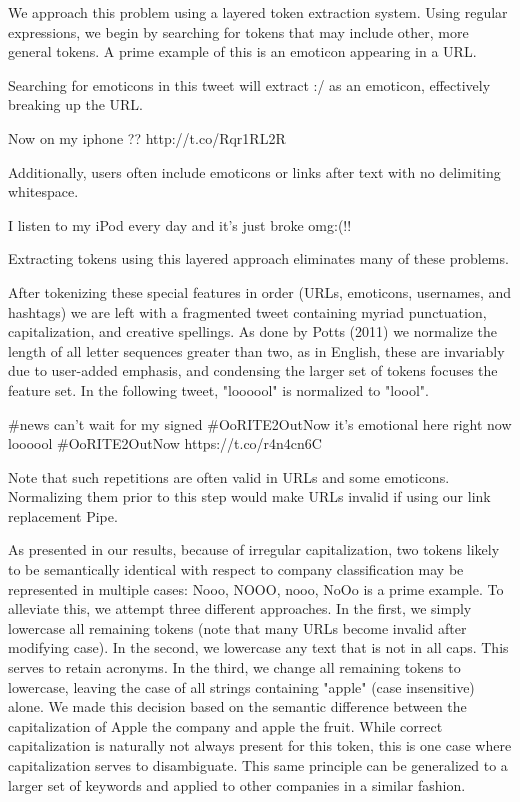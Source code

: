 \documentclass[letterpaper]{article}
\begin{document}
We approach this problem using a layered token extraction system. Using regular expressions, we begin by searching for tokens that may include other, more general tokens. A prime example of this is an emoticon appearing in a URL.

Searching for emoticons in this tweet will extract :/ as an emoticon, effectively breaking up the URL.

Now on my iphone ?? http://t.co/Rqr1RL2R 

Additionally, users often include emoticons or links after text with no delimiting whitespace. 

I listen to my iPod every day and it's just broke omg:(!!

Extracting tokens using this layered approach eliminates many of these problems.

After tokenizing these special features in order (URLs, emoticons, usernames, and hashtags) we are left with a fragmented tweet containing myriad punctuation, capitalization, and creative spellings. As done by Potts (2011) we normalize the length of all letter sequences greater than two, as in English, these are invariably due to user-added emphasis, and condensing the larger set of tokens focuses the feature set. In the following tweet, "loooool" is normalized to "loool".

\#news can't wait for my signed \#OoRITE2OutNow it's emotional here right now loooool \#OoRITE2OutNow https://t.co/r4n4cn6C 

Note that such repetitions are often valid in URLs and some emoticons. Normalizing them prior to this step would make URLs invalid if using our link replacement Pipe.

As presented in our results, because of irregular capitalization, two tokens likely to be semantically identical with respect to company classification may be represented in multiple cases: {Nooo, NOOO, nooo, NoOo} is a prime example. To alleviate this, we attempt three different approaches. In the first, we simply lowercase all remaining tokens (note that many URLs become invalid after modifying case). In the second, we lowercase any text that is not in all caps. This serves to retain acronyms. In the third, we change all remaining tokens to lowercase, leaving the case of all strings containing "apple" (case insensitive) alone. We made this decision based on the semantic difference between the capitalization of Apple the company and apple the fruit. While correct capitalization is naturally not always present for this token, this is one case where capitalization serves to disambiguate. This same principle can be generalized to a larger set of keywords and applied to other companies in a similar fashion. 
\end{document}
